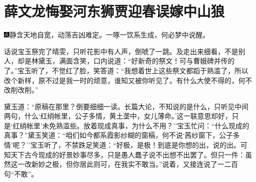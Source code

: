 \chapter{薛文龙悔娶河东狮\hspace{.5em}贾迎春误嫁中山狼}

{\includegraphics[width=3mm]{../Images/00005}\kaishu 静含天地自宽，动荡吉凶难定。一啄一饮系生成，何必梦中说醒。}

话说宝玉祭完了晴雯，只听花影中有人声，倒唬了一跳。及走出来细看，不是别人，却是林黛玉，满面含笑，口内说道：``好新奇的祭文！可与曹娥碑并传的了。''宝玉听了，不觉红了脸，笑答道：``我想着世上这些祭文都蹈于熟滥了，所以改个新样，原不过是我一时的顽意，谁知又被你听见了。有什么大使不得的，何不改削改削。''

黛玉道：``原稿在那里？倒要细细一读。长篇大论，不知说的是什么，只听见中间两句，什么`红绡帐里，公子多情，黄土垄中，女儿薄命。'这一联意思却好，只是`红绡帐里'未免熟滥些。放着现成真事，为什么不用？''宝玉忙问：``什么现成的真事？''黛玉笑道：``咱们如今都系霞影纱糊的窗槅，何不说`茜纱窗下，公子多情'呢？''宝玉听了，不禁跌足笑道：``好极，是极！到底是你想的出，说的出。可知天下古今现成的好景妙事尽多，只是愚人蠢子说不出想不出罢了。但只一件：虽然这一改新妙之极，但你居此则可，在我实不敢当。''说着，又接连说了一二百句``不敢''。

